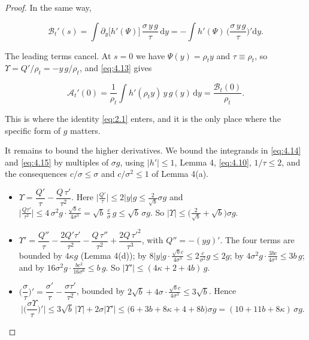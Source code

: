 \documentclass[aip,jmp,preprint,onecolumn,floatfix,superscriptaddress,nofootinbib,11pt]{revtex4-2}
\theoremstyle{plain}
\theoremstyle{remark}
\numberwithin{equation}{section}
\newcommand{\dd}{\mathrm{d}}
\begin{document}
\begin{proof}
In the same way,

\begin{equation}
\mathcal B_t'(s)=\int\partial_y\big[h'(\Psi)\big]\,\frac{\sigma\,y\,g}{\tau}\,\dd y=-\int h'(\Psi)\,\Big(\frac{\sigma\,y\,g}{\tau}\Big)'\dd y .
\label{eq:4.15}
\end{equation}

The leading terms cancel. At $s=0$ we have $\Psi(y)=\rho_ty$ and $\tau\equiv\rho_t$, so $\Upsilon=Q'/\rho_t=-y\,g/\rho_t$, and \eqref{eq:4.13} gives

\begin{equation}
\mathcal A_t'(0)=\frac{1}{\rho_t}\int h'(\rho_ty)\,y\,g(y)\,\dd y=\frac{\mathcal B_t(0)}{\rho_t} .
\label{eq:4.16}
\end{equation}

This is where the identity \eqref{eq:2.1} enters, and it is the only place where the specific form of $g$ matters.

It remains to bound the higher derivatives. We bound the integrands in \eqref{eq:4.14} and \eqref{eq:4.15} by multiples of $\sigma g$, using $|h'|\le1$, Lemma 4, \eqref{eq:4.10}, $1/\tau\le2$, and the consequences $c/\sigma\le\sigma$ and $c/\sigma^{2}\le1$ of Lemma 4(a).

\begin{itemize}
\item $\Upsilon=\dfrac{Q'}{\tau}-\dfrac{Q\,\tau'}{\tau^{2}}$. Here $\big|\tfrac{Q'}{\tau}\big|\le2|y|g\le\tfrac{2}{\sqrt b}\sigma g$ and $\big|\tfrac{Q\tau'}{\tau^{2}}\big|\le4\,\sigma^{2}g\cdot\tfrac{\sqrt b\,c}{4\sigma^{3}}=\sqrt b\,\tfrac c\sigma\,g\le\sqrt b\,\sigma g$. So $|\Upsilon|\le\big(\tfrac{2}{\sqrt b}+\sqrt b\big)\sigma g$.
\item $\Upsilon'=\dfrac{Q''}{\tau}-\dfrac{2Q'\tau'}{\tau^{2}}-\dfrac{Q\,\tau''}{\tau^{2}}+\dfrac{2Q\,\tau'^{2}}{\tau^{3}}$, with $Q''=-(yg)'$. The four terms are bounded by $4\kappa g$ (Lemma 4(d)); by $8|y|g\cdot\tfrac{\sqrt bc}{4\sigma^{3}}\le2\tfrac{c}{\sigma^{2}}g\le2g$; by $4\sigma^{2}g\cdot\tfrac{3bc}{4\sigma^{4}}\le3b\,g$; and by $16\sigma^{2}g\cdot\tfrac{bc^{2}}{16\sigma^{6}}\le b\,g$. So $|\Upsilon'|\le(4\kappa+2+4b)\,g$.
\item $\Big(\dfrac\sigma\tau\Big)'=\dfrac{\sigma'}{\tau}-\dfrac{\sigma\tau'}{\tau^{2}}$, bounded by $2\sqrt b+4\sigma\cdot\tfrac{\sqrt bc}{4\sigma^{3}}\le3\sqrt b$. Hence
\begin{equation*}
\Big|\Big(\frac{\sigma \Upsilon}{\tau}\Big)'\Big|\le3\sqrt b\,|\Upsilon|+2\sigma|\Upsilon'|\le\big(6+3b+8\kappa+4+8b\big)\sigma g=(10+11b+8\kappa)\,\sigma g .
\end{equation*}


\end{itemize}
\end{proof}
\end{document}
